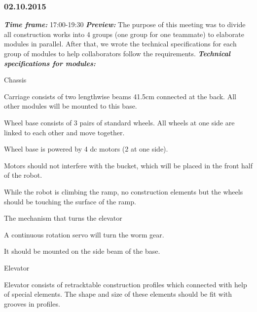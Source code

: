 \subsubsection{02.10.2015}
	\textit{\textbf{Time frame:}} 17:00-19:30 \newline
	\textit{\textbf{Preview:}} The purpose of this meeting was to divide all construction works into 4 groups (one group for one teammate) to elaborate modules in parallel. After that, we wrote the technical specifications for each group of modules to help collaborators follow the requirements. \newline \newline
	\textit{\textbf{Technical specifications for modules:}}
  \begin{enumerate*}
  	\item Chassis
  	\begin{enumerate*}
  		\item Carriage consists of two lengthwise beams 41.5cm connected at the back. All other modules will be mounted to this base. 
  		
  		\item Wheel base consists of 3 pairs of standard wheels. All wheels at one side are linked to each other and move together.
  		
  		\item Wheel base is powered by 4 dc motors (2 at one side). 
  		
  		\item Motors should not interfere with the bucket, which will be placed in the front half of the robot. 
  		
  		\item While the robot is climbing the ramp, no construction elements but the wheels should be touching the surface of the ramp. 
  		
  	\end{enumerate*}
  	
  	\item The mechanism that turns the elevator
  	\begin{enumerate*}
  		\item A continuous rotation servo will turn the worm gear.
  		
  		\item It should be mounted on the side beam of the base.
  	\end{enumerate*}
  	
  	\item Elevator
  	\begin{enumerate*}
  		\item Elevator consists of retracktable construction profiles which connected with help of special elements. The shape and size of these elements should be fit with grooves in profiles.
  		

\end{enumerate*}
\end{enumerate*}
